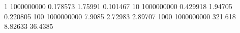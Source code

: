 1 1000000000 0.178573 1.75991 0.101467
10 1000000000 0.429918 1.94705 0.220805
100 1000000000 7.9085 2.72983 2.89707
1000 1000000000 321.618 8.82633 36.4385

